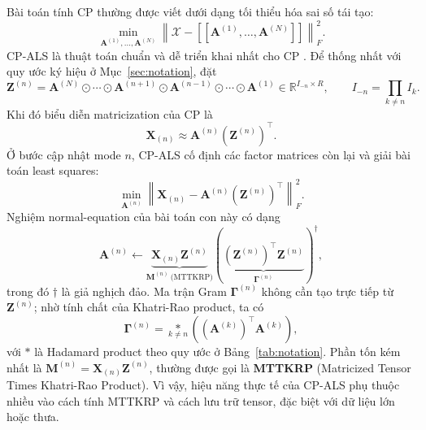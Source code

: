 Bài toán tính CP thường được viết dưới dạng tối thiểu hóa sai số tái tạo:
\begin{equation}
    \min_{\mathbf{A}^{(1)},\ldots,\mathbf{A}^{(N)}}
    \left\|
    \mathcal{X}
    -
    [\![\mathbf{A}^{(1)}, \ldots, \mathbf{A}^{(N)}]\!]
    \right\|_F^2.
    \label{eq:dm-cp-objective}
\end{equation}
CP-ALS là thuật toán chuẩn và dễ triển khai nhất cho CP \cite{chrysos2025foundationsTutorial}. Để thống nhất với quy ước ký hiệu ở Mục~\ref{sec:notation}, đặt
\begin{equation}
    \mathbf{Z}^{(n)}
    =
    \mathbf{A}^{(N)} \odot \cdots \odot \mathbf{A}^{(n+1)}
    \odot \mathbf{A}^{(n-1)} \odot \cdots \odot \mathbf{A}^{(1)}
    \in \mathbb{R}^{I_{-n}\times R},
    \qquad
    I_{-n} = \prod_{k\neq n} I_k.
    \label{eq:dm-khatri-rao-chain}
\end{equation}
Khi đó biểu diễn matricization của CP là
\begin{equation}
    \mathbf{X}_{(n)}
    \approx
    \mathbf{A}^{(n)}(\mathbf{Z}^{(n)})^\top.
    \label{eq:dm-cp-matricized}
\end{equation}
Ở bước cập nhật mode $n$, CP-ALS cố định các factor matrices còn lại và giải bài toán least squares:
\begin{equation}
    \min_{\mathbf{A}^{(n)}}
    \left\|
    \mathbf{X}_{(n)}
    -
    \mathbf{A}^{(n)}(\mathbf{Z}^{(n)})^\top
    \right\|_F^2.
    \label{eq:dm-als-subproblem}
\end{equation}
Nghiệm normal-equation của bài toán con này có dạng
\begin{equation}
    \mathbf{A}^{(n)}
    \leftarrow
    \underbrace{\mathbf{X}_{(n)}\mathbf{Z}^{(n)}}_{\mathbf{M}^{(n)}\ \text{(MTTKRP)}}
    \left(
    \underbrace{(\mathbf{Z}^{(n)})^\top\mathbf{Z}^{(n)}}_{\boldsymbol{\Gamma}^{(n)}}
    \right)^{\dagger},
    \label{eq:dm-als-update}
\end{equation}
trong đó $\dagger$ là giả nghịch đảo. Ma trận Gram $\boldsymbol{\Gamma}^{(n)}$ không cần tạo trực tiếp từ $\mathbf{Z}^{(n)}$; nhờ tính chất của Khatri-Rao product, ta có
\begin{equation}
    \boldsymbol{\Gamma}^{(n)}
    =
    \underset{k\neq n}{\ast}
    \left((\mathbf{A}^{(k)})^\top\mathbf{A}^{(k)}\right),
    \label{eq:dm-als-gram}
\end{equation}
với $\ast$ là Hadamard product theo quy ước ở Bảng~\ref{tab:notation}. Phần tốn kém nhất là $\mathbf{M}^{(n)}=\mathbf{X}_{(n)}\mathbf{Z}^{(n)}$, thường được gọi là \textbf{MTTKRP} (Matricized Tensor Times Khatri-Rao Product). Vì vậy, hiệu năng thực tế của CP-ALS phụ thuộc nhiều vào cách tính MTTKRP và cách lưu trữ tensor, đặc biệt với dữ liệu lớn hoặc thưa.

